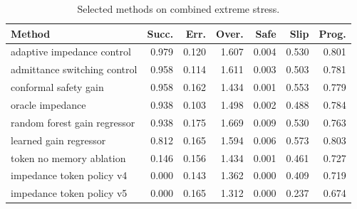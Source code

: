 \begin{table}[t]
\centering
\caption{Selected methods on combined extreme stress.}
\label{tab:selected-split}
\small
\begin{tabular}{lrrrrrr}
\toprule
Method & Succ. & Err. & Over. & Safe & Slip & Prog. \\
\midrule
adaptive impedance control & 0.979 & 0.120 & 1.607 & 0.004 & 0.530 & 0.801 \\
admittance switching control & 0.958 & 0.114 & 1.611 & 0.003 & 0.503 & 0.781 \\
conformal safety gain & 0.958 & 0.162 & 1.434 & 0.001 & 0.553 & 0.779 \\
oracle impedance & 0.938 & 0.103 & 1.498 & 0.002 & 0.488 & 0.784 \\
random forest gain regressor & 0.938 & 0.175 & 1.669 & 0.009 & 0.530 & 0.763 \\
learned gain regressor & 0.812 & 0.165 & 1.594 & 0.006 & 0.573 & 0.803 \\
token no memory ablation & 0.146 & 0.156 & 1.434 & 0.001 & 0.461 & 0.727 \\
impedance token policy v4 & 0.000 & 0.143 & 1.362 & 0.000 & 0.409 & 0.719 \\
impedance token policy v5 & 0.000 & 0.165 & 1.312 & 0.000 & 0.237 & 0.674 \\
\bottomrule
\end{tabular}
\end{table}

